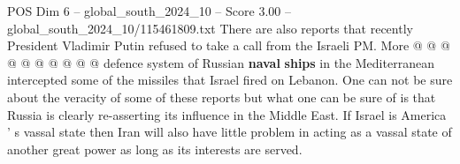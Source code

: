 \begin{textsample}{POS Dim 6 – global\_south\_2024\_10 – Score 3.00 – global\_south\_2024\_10/115461809.txt}
There are also reports that recently President Vladimir Putin refused to take a call from the Israeli PM.
More @ @ @ @ @ @ @ @ @ @ defence system of Russian \textbf{naval} \textbf{ships} in the Mediterranean intercepted some of the missiles that Israel fired on Lebanon.
One can not be sure about the veracity of some of these reports but what one can be sure of is that Russia is clearly re-asserting its influence in the Middle East.
If Israel is America ' s vassal state then Iran will also have little problem in acting as a vassal state of another great power as long as its interests are served.

\end{textsample}

